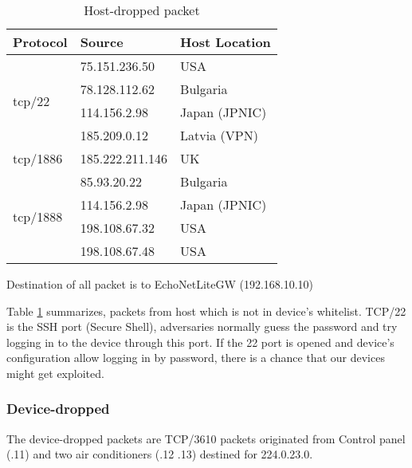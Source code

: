 \begin{table}[h]
    \centering
    \begin{tabular*}{\textwidth}{ @{\extracolsep{\fill}} lll}
        \textbf{Protocol}             & \textbf{Source}          & \textbf{Host Location} \\  \toprule 
        \multirow{4}{*}{tcp/22}     & 75.151.236.50     & USA           \\ 
                                    & 78.128.112.62     & Bulgaria      \\
                                    & 114.156.2.98      & Japan (JPNIC) \\
                                    & 185.209.0.12      & Latvia (VPN)  \\ \hline
        tcp/1886                    & 185.222.211.146   & UK            \\ \hline
        \multirow{4}{*}{tcp/1888}   & 85.93.20.22       & Bulgaria      \\
                                    & 114.156.2.98      & Japan (JPNIC) \\
                                    & 198.108.67.32     & USA           \\
                                    & 198.108.67.48     & USA           \\ \bottomrule
    \end{tabular*}  
    \begin{tablenotes}
        \small
        \item Destination of all packet is to EchoNetLiteGW (192.168.10.10)
    \end{tablenotes}
    \caption{Host-dropped packet }
    \label{table:s4_host_drop}
\end{table}

Table \ref{table:s4_host_drop} summarizes, packets from host which is not in device's whitelist. TCP/22 is the SSH port (Secure Shell), adversaries normally guess the password and try logging in to the device through this port. If the 22 port is opened and device’s configuration allow logging in by password, there is a chance that our devices might get exploited.

\subsubsection{Device-dropped}
The device-dropped packets are TCP/3610 packets originated from Control panel (.11) and two air conditioners (.12 .13) destined for 224.0.23.0.  

